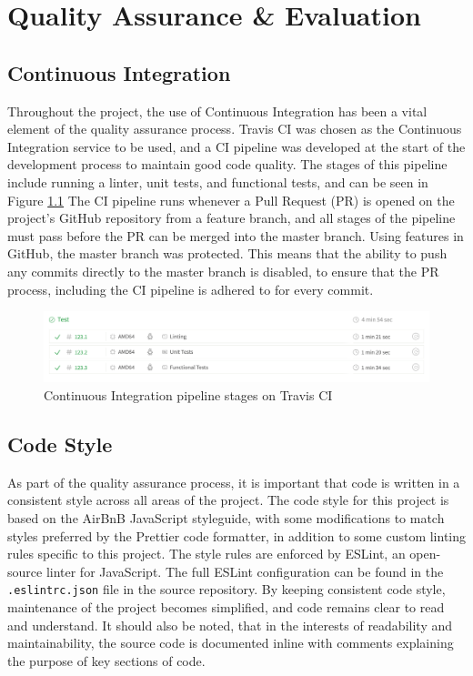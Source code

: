 \chapter{Quality Assurance \& Evaluation}


\section{Continuous Integration}
Throughout the project, the use of Continuous Integration has been a vital element of the quality assurance process. Travis CI was chosen as the Continuous Integration service to be used, and a CI pipeline was developed at the start of the development process to maintain good code quality. The stages of this pipeline include running a linter, unit tests, and functional tests, and can be seen in Figure \ref{fig:ci-pipeline} The CI pipeline runs whenever a Pull Request (PR) is opened on the project's GitHub repository from a feature branch, and all stages of the pipeline must pass before the PR can be merged into the master branch. Using features in GitHub, the master branch was protected. This means that the ability to push any commits directly to the master branch is disabled, to ensure that the PR process, including the CI pipeline is adhered to for every commit.

\begin{figure}[h!]
  \centering
  \includegraphics[width=\textwidth]{images/ci-pipeline.png}
  \caption{Continuous Integration pipeline stages on Travis CI}
  \label{fig:ci-pipeline}
\end{figure}

\section{Code Style}
As part of the quality assurance process, it is important that code is written in a consistent style across all areas of the project. The code style for this project is based on the AirBnB JavaScript styleguide, with some modifications to match styles preferred by the Prettier code formatter, in addition to some custom linting rules specific to this project. The style rules are enforced by ESLint, an open-source linter for JavaScript. The full ESLint configuration can be found in the \verb|.eslintrc.json| file in the source repository. By keeping consistent code style, maintenance of the project becomes simplified, and code remains clear to read and understand. It should also be noted, that in the interests of readability and maintainability, the source code is documented inline with comments explaining the purpose of key sections of code.


